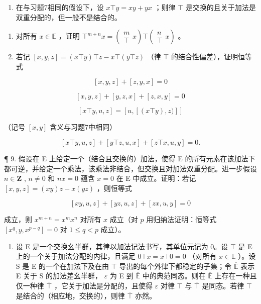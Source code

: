 \begin{enumerate}
\def\labelenumi{\arabic{enumi}.}
\setcounter{enumi}{7}
\tightlist
\item
  在与习题7相同的假设下，设 \(x \top y = xy + yx\) ；则律 \(\top\) 是交换的且关于加法是双重分配的，但一般不是结合的。
\end{enumerate}

\begin{enumerate}
\def\labelenumi{(\alph{enumi})}
\item
  对所有 \(x \in \mathbb{E}\) ，证明 \(\top^{m+n} x = \left( \begin{array}{c} m \\ \top \end{array} x \right) \top \left( \begin{array}{c} n \\ \top \end{array} x \right)\) 。
\item
  若记 \([x, y, z] = (x \top y) \top z - x \top (y \top z)\) （律 \(\top\) 的结合性偏差），证明恒等式
\end{enumerate}

\[
[ x, y, z ] + [ z, y, x ] = 0
\]

\[
[ x, y, z ] + [ y, z, x ] + [ z, x, y ] = 0
\]

\[
[ x \top y, u, z ] = [ u, [ (x \top y), z) ] ]
\]

（记号 \([x, y]\) 含义与习题7中相同）

\[
[ x \top y, u, z ] + [ y \top z, u, x ] + [ z \top x, u, y ] = 0.
\]

¶ 9. 假设在 E 上给定一个（结合且交换的）加法，使得 E 的所有元素在该加法下都可逆，并给定一个乘法，该乘法非结合，但交换且对加法双重分配。进一步假设 \(n \in \mathbf{Z}\) , \(n \neq 0\) 和 \(nx = 0\) 蕴含 \(x = 0\) 在 E 中成立。证明：若记 \([x, y, z] = (xy)z - x(yz)\) ，则恒等式

\[
[ x y, u, z ] + [ y z, u, z ] + [ z x, u, y ] = 0
\]

成立，则 \(x^{m + n} = x^m x^n\) 对所有 \(x\) 成立（对 \(p\) 用归纳法证明：恒等式 \([x^q, y, x^{p - q}] = 0\) 对 \(1 \leqslant q < p\) 成立）。

\begin{enumerate}
\def\labelenumi{\arabic{enumi}.}
\setcounter{enumi}{9}
\tightlist
\item
  设 E 是一个交换幺半群，其律以加法记法书写，其单位元记为 0。设 \(\top\) 是 E 上的一个关于加法分配的内律，且满足 \(0 \top x = x \top 0 = 0\) （对所有 \(x \in \mathbb{E}\) ）。设 S 是 E 的一个在加法下及在由 \(\top\) 导出的每个外律下都稳定的子集；令 \(\overline{\mathbb{E}}\) 表示 E 关于 S 的加法差幺半群， \(\varepsilon\) 为 E 到 \(\overline{\mathbb{E}}\) 中的典范同态。则在 \(\overline{\mathbb{E}}\) 上存在一种且仅一种律 \(\overline{\top}\) ，它关于加法是分配的，且使得 \(\varepsilon\) 对律 \(\top\) 与 \(\overline{\top}\) 是同态。若律 \(\top\) 是结合的（相应地，交换的），则律 \(\overline{\top}\) 亦然。
\end{enumerate}

